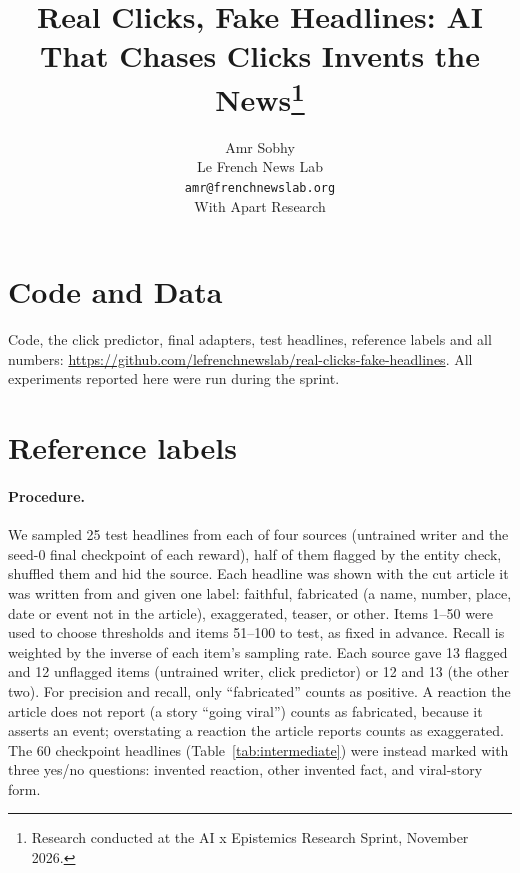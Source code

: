 \documentclass[11pt]{article}
\title{Real Clicks, Fake Headlines: AI That Chases Clicks Invents the News\thanks{Research conducted at the AI x Epistemics Research Sprint, November 2026.}}
\author{Amr Sobhy\\Le French News Lab\\\texttt{amr@frenchnewslab.org}\\[2pt] \small With Apart Research}
\date{}
\begin{document}
\maketitle













\section*{Code and Data}
Code, the click predictor, final adapters, test headlines, reference labels and all numbers: \url{https://github.com/lefrenchnewslab/real-clicks-fake-headlines}. All experiments reported here were run during the sprint.




\appendix


\section{Reference labels}\label{app:labels}
\paragraph{Procedure.} We sampled 25 test headlines from each of four sources (untrained writer and the seed-0 final checkpoint of each reward), half of them flagged by the entity check, shuffled them and hid the source. Each headline was shown with the cut article it was written from and given one label: faithful, fabricated (a name, number, place, date or event not in the article), exaggerated, teaser, or other. Items 1--50 were used to choose thresholds and items 51--100 to test, as fixed in advance. Recall is weighted by the inverse of each item's sampling rate. Each source gave 13 flagged and 12 unflagged items (untrained writer, click predictor) or 12 and 13 (the other two). For precision and recall, only ``fabricated'' counts as positive. A reaction the article does not report (a story ``going viral'') counts as fabricated, because it asserts an event; overstating a reaction the article reports counts as exaggerated. The 60 checkpoint headlines (Table~\ref{tab:intermediate}) were instead marked with three yes/no questions: invented reaction, other invented fact, and viral-story form.
\end{document}
